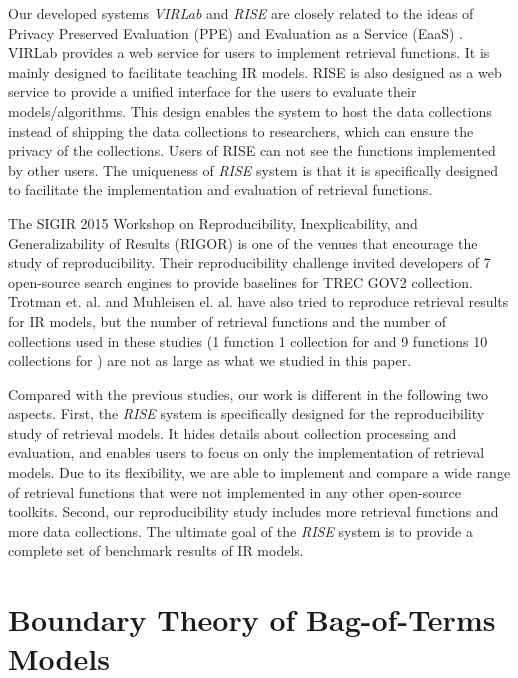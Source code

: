 Our developed systems {\em VIRLab} and {\em RISE} are closely related to 
the ideas of Privacy Preserved Evaluation (PPE) 
\cite{Fang:2014:VWV:2600428.2611178}
and Evaluation as a Service (EaaS) 
\cite{rao:ecir:2015,Lin:2013:ESI:2568388.2568390,Lin:2014:ISE:2567948.2577014}. 
VIRLab \cite{Fang:2014:VWV:2600428.2611178} provides a web service
for users to implement retrieval functions. It is mainly designed
to facilitate teaching IR models. RISE is also designed as a 
web service to provide a unified interface for the users to evaluate their 
models/algorithms. This design enables the system to host the data 
collections instead of shipping the data collections to researchers, 
which can ensure the privacy of the collections. 
Users of RISE can not see the functions implemented by other users. 
The uniqueness of 
{\em RISE} system is that it is specifically designed to facilitate the 
implementation and evaluation of retrieval functions.  

The SIGIR 2015 Workshop on Reproducibility, Inexplicability, and 
Generalizability of Results (RIGOR) \cite{Hopfgartner:2015:REE:2795403.2795416} 
is one of the venues that encourage the study of reproducibility. 
Their reproducibility challenge invited developers 
of 7 open-source search engines to provide baselines for TREC GOV2 
collection.
Trotman et. al. \cite{adcs14} and Muhleisen el. al. \cite{Muhleisen:2014:ODG:2600428.2609460} 
have also tried to reproduce retrieval results for IR models, but the
number of retrieval functions and the number of collections used in these studies 
(1 function 1 collection for \cite{adcs14} and 9 functions  
10 collections for \cite{Muhleisen:2014:ODG:2600428.2609460})
are not as large as what we studied in this paper. 

Compared with the previous studies, our work is different in the following
two aspects. First, the {\em RISE} system is specifically designed for 
the reproducibility study of retrieval models. It hides details about 
collection processing and evaluation, and enables users to focus on 
only the implementation of retrieval models. Due to its flexibility, 
we are able to implement and compare a wide range of retrieval functions 
that were not implemented in any other open-source toolkits. Second, 
our reproducibility study includes more retrieval functions and more data 
collections. The ultimate goal of the {\em RISE} system is to provide 
a complete set of benchmark results of IR models. 


\section{Boundary Theory of Bag-of-Terms Models}

